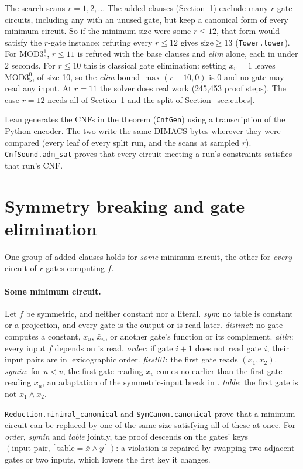 \documentclass[11pt]{article}
\newcommand{\MOD}[2]{\mathrm{MOD3}^{#1}_{#2}}
\newcommand{\size}{\mathrm{size}}
\newcommand{\lean}[1]{\texttt{#1}}
\begin{document}
The search scans $r=1,2,\dots$ The added clauses (Section~\ref{sec:constraints}) exclude many $r$-gate
circuits, including any with an unused gate, but keep a canonical form of every minimum circuit. So if the minimum
size were some $r\le12$, that form would satisfy the $r$-gate instance; refuting every $r\le12$ gives
$\size\ge13$ (\lean{Tower.lower}). For $\MOD{1}{6}$, $r\le11$ is refuted with the base clauses and \emph{elim}
alone, each in under 2 seconds. For $r\le10$ this is classical gate elimination: setting $x_v=1$ leaves
$\MOD{0}{5}$, of size 10, so the \emph{elim} bound $\max(r-10,0)$ is 0 and no gate may read any input. At $r=11$ the solver does real work (245{,}453 proof steps). The case
$r=12$ needs all of Section~\ref{sec:constraints} and the split of Section~\ref{sec:cubes}.

Lean generates the CNFs in the theorem (\lean{CnfGen}) using a transcription of the Python encoder. The two
write the same DIMACS bytes wherever they were compared (every leaf of every split run, and the scans at
sampled $r$). \lean{CnfSound.adm\_sat} proves that every circuit meeting a run's constraints satisfies that
run's CNF.

\section{Symmetry breaking and gate elimination}\label{sec:constraints}

One group of added clauses holds for \emph{some} minimum circuit, the other for \emph{every}
circuit of $r$ gates computing $f$.

\paragraph{Some minimum circuit.} Let $f$ be symmetric, and neither constant nor a literal.
\emph{sym}: no table is constant or a projection, and every gate is the output or is read later.
\emph{distinct}: no gate computes a constant, $x_u$, $\bar x_u$, or another gate's function or its complement.
\emph{allin}: every input $f$ depends on is read. \emph{order}: if gate $i+1$ does not read gate $i$, their input
pairs are in lexicographic order. \emph{first01}: the first gate reads $(x_1,x_2)$. \emph{symin}: for $u<v$, the
first gate reading $x_v$ comes no earlier than the first gate reading $x_u$, an adaptation of the
symmetric-input break in \cite{haaswijk}. \emph{table}: the first gate is not $\bar x_1\wedge x_2$.

\lean{Reduction.minimal\_canonical} and \lean{SymCanon.canonical} prove that a minimum circuit can be replaced by
one of the same size satisfying all of these at once. For \emph{order}, \emph{symin} and \emph{table} jointly,
the proof descends on the gates' keys $(\text{input pair},[\text{table}=\bar x\wedge y])$: a violation is
repaired by swapping two adjacent gates or two inputs, which lowers the first key it changes.
\end{document}
